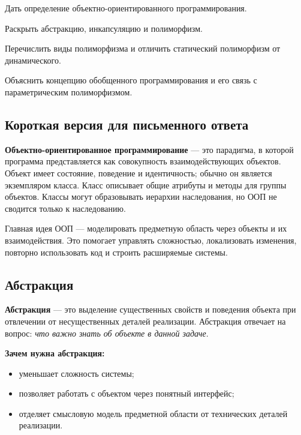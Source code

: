 
\begin{examplan}
    \item Дать определение объектно-ориентированного программирования.
    \item Раскрыть абстракцию, инкапсуляцию и полиморфизм.
    \item Перечислить виды полиморфизма и отличить статический полиморфизм от динамического.
    \item Объяснить концепцию обобщенного программирования и его связь с параметрическим полиморфизмом.
\end{examplan}

\subsection*{Короткая версия для письменного ответа}

\textbf{Объектно-ориентированное программирование} --- это парадигма, в которой программа представляется как совокупность взаимодействующих объектов. Объект имеет состояние, поведение и идентичность; обычно он является экземпляром класса. Класс описывает общие атрибуты и методы для группы объектов. Классы могут образовывать иерархии наследования, но ООП не сводится только к наследованию.

Главная идея ООП --- моделировать предметную область через объекты и их взаимодействия. Это помогает управлять сложностью, локализовать изменения, повторно использовать код и строить расширяемые системы.

\subsection*{Абстракция}

\textbf{Абстракция} --- это выделение существенных свойств и поведения объекта при отвлечении от несущественных деталей реализации. Абстракция отвечает на вопрос: \textit{что важно знать об объекте в данной задаче}.

\textbf{Зачем нужна абстракция:}
\begin{itemize}
    \item уменьшает сложность системы;
    \item позволяет работать с объектом через понятный интерфейс;
    \item отделяет смысловую модель предметной области от технических деталей реализации.
\end{itemize}

